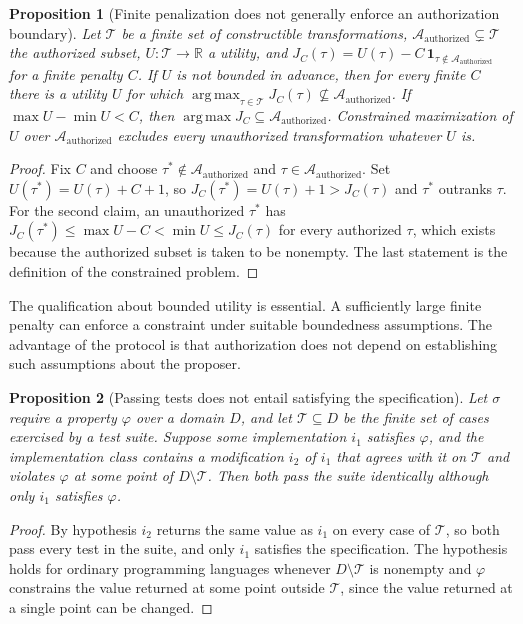 \documentclass[11pt]{article}
\newtheorem{proposition}{Proposition}
\theoremstyle{remark}
\newcommand{\Tt}{\mathcal{T}}
\begin{document}
\begin{proposition}[Finite penalization does not generally enforce an authorization boundary]\label{prop:penalty}
Let $\Tt$ be a finite set of constructible transformations, $\mathcal A_{\mathrm{authorized}}\subsetneq\Tt$ the authorized subset, $U:\Tt\to\mathbb R$ a utility, and $J_C(\tau)=U(\tau)-C\,\mathbf 1_{\tau\notin\mathcal A_{\mathrm{authorized}}}$ for a finite penalty $C$. If $U$ is not bounded in advance, then for every finite $C$ there is a utility $U$ for which $\operatorname{arg\,max}_{\tau\in\Tt}J_C(\tau)\not\subseteq\mathcal A_{\mathrm{authorized}}$. If $\max U-\min U<C$, then $\operatorname{arg\,max}J_C\subseteq\mathcal A_{\mathrm{authorized}}$. Constrained maximization of $U$ over $\mathcal A_{\mathrm{authorized}}$ excludes every unauthorized transformation whatever $U$ is.
\end{proposition}
\begin{proof}
Fix $C$ and choose $\tau^\ast\notin\mathcal A_{\mathrm{authorized}}$ and $\tau\in\mathcal A_{\mathrm{authorized}}$. Set $U(\tau^\ast)=U(\tau)+C+1$, so $J_C(\tau^\ast)=U(\tau)+1>J_C(\tau)$ and $\tau^\ast$ outranks $\tau$. For the second claim, an unauthorized $\tau^\ast$ has $J_C(\tau^\ast)\le\max U-C<\min U\le J_C(\tau)$ for every authorized $\tau$, which exists because the authorized subset is taken to be nonempty. The last statement is the definition of the constrained problem.
\end{proof}

The qualification about bounded utility is essential. A sufficiently large finite penalty can enforce a constraint under suitable boundedness assumptions. The advantage of the protocol is that authorization does not depend on establishing such assumptions about the proposer.

\begin{proposition}[Passing tests does not entail satisfying the specification]
Let $\sigma$ require a property $\varphi$ over a domain $D$, and let $\mathcal T\subseteq D$ be the finite set of cases exercised by a test suite. Suppose some implementation $i_1$ satisfies $\varphi$, and the implementation class contains a modification $i_2$ of $i_1$ that agrees with it on $\mathcal T$ and violates $\varphi$ at some point of $D\setminus\mathcal T$. Then both pass the suite identically although only $i_1$ satisfies $\varphi$.
\end{proposition}
\begin{proof}
By hypothesis $i_2$ returns the same value as $i_1$ on every case of $\mathcal T$, so both pass every test in the suite, and only $i_1$ satisfies the specification. The hypothesis holds for ordinary programming languages whenever $D\setminus\mathcal T$ is nonempty and $\varphi$ constrains the value returned at some point outside $\mathcal T$, since the value returned at a single point can be changed.
\end{proof}
\end{document}

